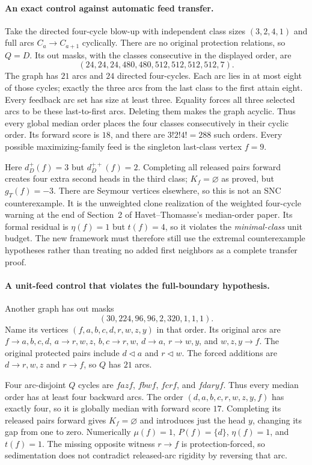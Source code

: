 \paragraph{An exact control against automatic feed transfer.}
Take the directed four-cycle blow-up with independent class sizes
$(3,2,4,1)$ and full arcs $C_a\to C_{a+1}$ cyclically. There are
no original protection relations, so $Q=D$. Its out masks, with
the classes consecutive in the displayed order, are
\[
 (24,24,24,480,480,512,512,512,512,7).
\]
The graph has $21$ arcs and $24$ directed four-cycles. Each arc lies
in at most eight of those cycles; exactly the three arcs from the
last class to the first attain eight. Every feedback arc set has
size at least three. Equality forces all three selected arcs to be
these last-to-first arcs. Deleting them makes the graph acyclic.
Thus every global median order places the four classes consecutively
in their cyclic order. Its forward score is $18$, and there are
$3!2!4!=288$ such orders. Every possible maximizing-family feed is
the singleton last-class vertex $f=9$.

Here $d_D^+(f)=3$ but $d_D^{++}(f)=2$. Completing all released
pairs forward creates four extra second heads in the third class;
$K_f=\varnothing$ as proved, but $g_T(f)=-3$. There are Seymour
vertices elsewhere, so this is not an SNC counterexample. It is the
unweighted clone realization of the weighted four-cycle warning at
the end of Section~2 of Havet--Thomasse's median-order paper.
Its formal residual is $\eta(f)=1$ but $t(f)=4$, so it violates the
\emph{minimal-class} unit budget. The new framework must
therefore still use the extremal counterexample hypotheses rather
than treating no added first neighbors as a complete transfer proof.

\paragraph{A unit-feed control that violates the full-boundary hypothesis.}
Another graph has out masks
\[
 (30,224,96,96,2,320,1,1,1).
\]
Name its vertices $(f,a,b,c,d,r,w,z,y)$ in that order. Its original
arcs are $f\to a,b,c,d$, $a\to r,w,z$, $b,c\to r,w$, $d\to a$,
$r\to w,y$, and $w,z,y\to f$. The original protected pairs include
$d\triangleleft a$ and $r\triangleleft w$. The forced additions are
$d\to r,w,z$ and $r\to f$, so $Q$ has $21$ arcs.

Four arc-disjoint $Q$ cycles are $f a z f$, $f b w f$, $f c r f$,
and $f d a r y f$. Thus every median order has at least four backward
arcs. The order $(d,a,b,c,r,w,z,y,f)$ has exactly four, so it is
globally median with forward score $17$. Completing its released
pairs forward gives $K_f=\varnothing$ and introduces just the head
$y$, changing its gap from one to zero. Numerically
$\mu(f)=1$, $P(f)=\{d\}$, $\eta(f)=1$, and $t(f)=1$.
The missing opposite witness $r\to f$ is protection-forced, so
sedimentation does not contradict released-arc rigidity by reversing
that arc.

